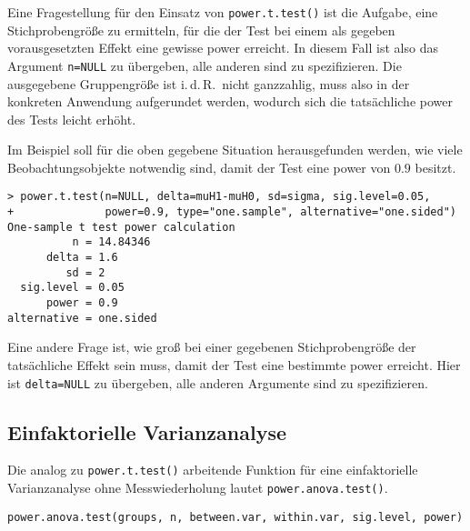 Eine Fragestellung für den Einsatz von \lstinline!power.t.test()! ist die Aufgabe, eine Stichprobengröße zu ermitteln, für die der Test bei einem als gegeben vorausgesetzten Effekt eine gewisse power erreicht. In diesem Fall ist also das Argument \lstinline!n=NULL! zu übergeben, alle anderen sind zu spezifizieren. Die ausgegebene Gruppengröße ist i.\,d.\,R.\ nicht ganzzahlig, muss also in der konkreten Anwendung aufgerundet werden, wodurch sich die tatsächliche power des Tests leicht erhöht.

Im Beispiel soll für die oben gegebene Situation herausgefunden werden, wie viele Beobachtungsobjekte notwendig sind, damit der Test eine power von $0.9$ besitzt.
\begin{lstlisting}
> power.t.test(n=NULL, delta=muH1-muH0, sd=sigma, sig.level=0.05,
+              power=0.9, type="one.sample", alternative="one.sided")
One-sample t test power calculation
          n = 14.84346
      delta = 1.6
         sd = 2
  sig.level = 0.05
      power = 0.9
alternative = one.sided
\end{lstlisting}

Eine andere Frage ist, wie groß bei einer gegebenen Stichprobengröße der tatsächliche Effekt sein muss, damit der Test eine bestimmte power erreicht. Hier ist \lstinline!delta=NULL! zu übergeben, alle anderen Argumente sind zu spezifizieren.

\subsection{Einfaktorielle Varianzanalyse}
\label{sec:powerAnova}

Die analog zu \lstinline!power.t.test()! arbeitende Funktion für eine einfaktorielle Varianzanalyse ohne Messwiederholung lautet \lstinline!power.anova.test()!.
\begin{lstlisting}
power.anova.test(groups, n, between.var, within.var, sig.level, power)
\end{lstlisting}

